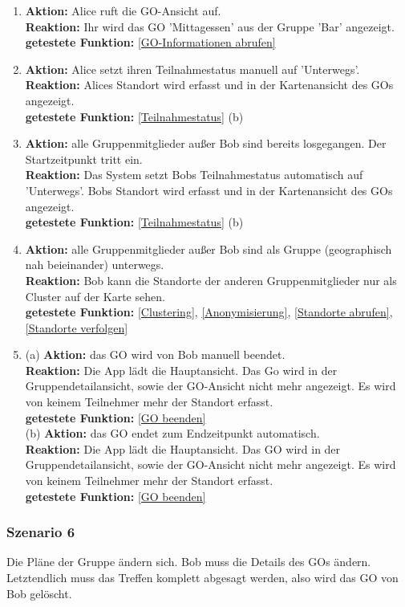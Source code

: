 \documentclass[parskip=full]{scrartcl}
\def\threedigits#1{%
  \ifnum#1<100 0\fi
  \ifnum#1<10 0\fi
  \number#1}
\begin{document}
\begin{enumerate}[label={\textbf{/T\protect\threedigits{\theenumi}0/}}, leftmargin=*, resume]
	\item \textbf{Aktion:} Alice ruft die GO-Ansicht auf.\\
	\textbf{Reaktion:} Ihr wird das GO 'Mittagessen' aus der Gruppe 'Bar' angezeigt.\\
	\textbf{getestete Funktion:} \ref{GO-Informationen abrufen}
	\item \textbf{Aktion:} Alice setzt ihren Teilnahmestatus manuell auf 'Unterwegs'.\\
	\textbf{Reaktion:} Alices Standort wird erfasst und in der Kartenansicht des GOs angezeigt.\\
	\textbf{getestete Funktion:} \ref{Teilnahmestatus} (b)
	\item \textbf{Aktion:} alle Gruppenmitglieder außer Bob sind bereits losgegangen. Der Startzeitpunkt tritt ein.\\
	\textbf{Reaktion:} Das System setzt Bobs Teilnahmestatus automatisch auf 'Unterwegs'. Bobs Standort wird erfasst und in der Kartenansicht des GOs angezeigt.\\
	\textbf{getestete Funktion: }\ref{Teilnahmestatus} (b)
	\item \textbf{Aktion:} alle Gruppenmitglieder außer Bob sind als Gruppe (geographisch nah beieinander) unterwegs.\\
	\textbf{Reaktion: }Bob kann die Standorte der anderen Gruppenmitglieder nur als Cluster auf der Karte sehen.\\
	\textbf{getestete Funktion:} \ref{Clustering}, \ref{Anonymisierung}, \ref{Standorte abrufen}, \ref{Standorte verfolgen}
	\item (a) \textbf{Aktion:} das GO wird von Bob manuell beendet. \\
	\textbf{Reaktion: }Die App lädt die Hauptansicht. Das Go wird in der Gruppendetailansicht, sowie der GO-Ansicht nicht mehr angezeigt. Es wird von keinem Teilnehmer mehr der Standort erfasst.\\
	\textbf{getestete Funktion:} \ref{GO beenden}\\
	 (b) \textbf{Aktion:} das GO endet zum Endzeitpunkt automatisch.\\
	 \textbf{Reaktion: }Die App lädt die Hauptansicht. Das GO wird in der Gruppendetailansicht, sowie der GO-Ansicht nicht mehr angezeigt. Es wird von keinem Teilnehmer mehr der Standort erfasst.\\	
	 \textbf{getestete Funktion:} \ref{GO beenden}
\end{enumerate}

\subsubsection*{Szenario 6} Die Pläne der Gruppe ändern sich. Bob muss die Details des GOs ändern. Letztendlich muss das Treffen komplett abgesagt werden, also wird das GO von Bob gelöscht.\\
\end{document}
